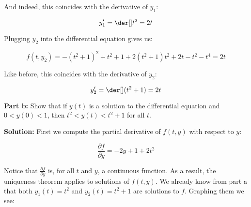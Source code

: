 \documentclass{article}
\begin{document}
And indeed, this coincides with the derivative of $y_1$:

\begin{equation*}
    y_1'=\der[]t^2=2t
\end{equation*}

Plugging $y_2$ into the differential equation gives us:

\begin{equation*}
    f(t,y_2)=-(t^2+1)^2+t^2+1+2(t^2+1)t^2+2t-t^2-t^4=2t
\end{equation*}

Like before, this coincides with the derivative of $y_2$:

\begin{equation*}
    y_2'=\der[](t^2+1)=2t
\end{equation*}
\smallskip

\noindent\textbf{Part b:} Show that if $y(t)$ is a solution to the differential equation and $0<y(0)<1$, then $t^2<y(t)<t^2+1$ for all $t$.
\bigskip

\noindent\textbf{Solution:} First we compute the partial derivative of $f(t,y)$ with respect to $y$:

\begin{equation*}
    \frac{\partial f}{\partial y}=-2y+1+2t^2
\end{equation*}

Notice that $\frac{\partial f}{\partial y}$ is, for all $t$ and $y$, a continuous function. As a result, the uniqueness theorem applies to solutions of $f(t,y)$. We already know from part a that both $y_1(t)=t^2$ and $y_2(t)=t^2+1$ are solutions to $f$. Graphing them we see:

\loadedtable

\begin{center}
\end{center}
\end{document}
